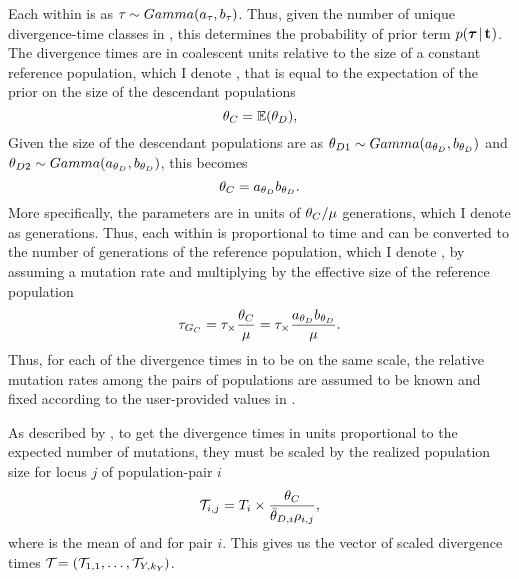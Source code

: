 \begin{linenomath}
Each \divTime{} within \divTimeVector is \iid as $\tau_{} \sim
Gamma(a_{\tau_{}}, b_{\tau_{}})$.
Thus, given the number of unique divergence-time classes in
\divTimeIndexVector, this determines the probability of prior term
$p(\boldsymbol{\tau_{}} \,|\, \mathbf{t_{}})$.
The divergence times are in coalescent units relative to the size of
a constant reference population, which I denote , that is equal to
the expectation of the prior on the size of the descendant populations
\begin{equation}
    \myTheta{C} = \mathbb{E}(\descendantTheta{}{}),
    \label{eq:thetaC}
\end{equation}
Given the size of the descendant populations are \iid as
$\descendantTheta{1}{} \sim Gamma(\gammaShape{\descendantTheta{}{}},
\gammaScale{\descendantTheta{}{}})$ and
$\descendantTheta{2}{} \sim Gamma(\gammaShape{\descendantTheta{}{}},
\gammaScale{\descendantTheta{}{}})$,
this becomes
\begin{equation}
    \myTheta{C} = \gammaShape{\descendantTheta{}{}}\gammaScale{\descendantTheta{}{}}.
    \label{eq:thetaCGamma}
\end{equation}
More specifically, the \divTime{} parameters are in units of
$\theta_{C}/\mu$ generations, which I denote as \globalcoalunit
generations.
Thus, each \divTime{} within \divTimeVector is proportional to time and can be
converted to the number of generations of the reference population, which I
denote , by assuming a mutation rate and multiplying by the
effective size of the reference population
\begin{equation}
    \divTime{G_C} = \divTime \times \frac{\myTheta{C}}{\mutationRate} = \divTime
    \times \frac{
    \gammaShape{\descendantTheta{}{}}\gammaScale{\descendantTheta{}{}}}
    {\mutationRate}.
    \label{eq:divTimeGenerations}
\end{equation}
Thus, for each of the divergence times in \divTimeVector to be on the same
scale, the relative mutation rates among the pairs of populations are assumed
to be known and fixed according to the user-provided values in
\mutationRateScalarConstantVector.
\end{linenomath}

\begin{linenomath}
As described by \cite{Oaks2012}, to get the divergence times in units
proportional to the expected number of mutations, they must be
scaled by the realized population size for locus $j$ of population-pair $i$ 
\begin{equation}
    \divTimeScaled{i}{j} = \divTimeMap{i} \times \frac{\myTheta{C}}{
        \descendantThetaMean{i} \ploidyScalar{i}{j}},
    \label{eq:divTimeScaled}
\end{equation}
where  is the mean of  and
 for pair $i$.
This gives us the vector of scaled divergence times
$\divTimeScaledVector = (\divTimeScaled{1}{1}, \ldots,
\divTimeScaled{\npairs{}}{\nloci{\npairs{}}})$.
\end{linenomath}


